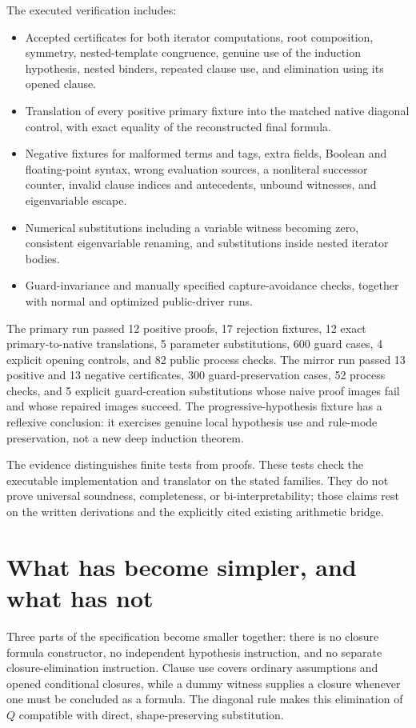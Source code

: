 \documentclass[11pt]{article}
\theoremstyle{definition}\newtheorem{definition}[theorem]{Definition}
\theoremstyle{remark}\newtheorem{remark}[theorem]{Remark}
\begin{document}
The executed verification includes:
\begin{itemize}
\item Accepted certificates for both iterator computations, root composition, symmetry, nested-template congruence, genuine use of the induction hypothesis, nested binders, repeated clause use, and elimination using its opened clause.
\item Translation of every positive primary fixture into the matched native diagonal control, with exact equality of the reconstructed final formula.
\item Negative fixtures for malformed terms and tags, extra fields, Boolean and floating-point syntax, wrong evaluation sources, a nonliteral successor counter, invalid clause indices and antecedents, unbound witnesses, and eigenvariable escape.
\item Numerical substitutions including a variable witness becoming zero, consistent eigenvariable renaming, and substitutions inside nested iterator bodies.
\item Guard-invariance and manually specified capture-avoidance checks, together with normal and optimized public-driver runs.
\end{itemize}
The primary run passed 12 positive proofs, 17 rejection fixtures, 12 exact primary-to-native translations, 5 parameter substitutions, 600 guard cases, 4 explicit opening controls, and 82 public process checks. The mirror run passed 13 positive and 13 negative certificates, 300 guard-preservation cases, 52 process checks, and 5 explicit guard-creation substitutions whose naive proof images fail and whose repaired images succeed. The progressive-hypothesis fixture has a reflexive conclusion: it exercises genuine local hypothesis use and rule-mode preservation, not a new deep induction theorem.

The evidence distinguishes finite tests from proofs. These tests check the executable implementation and translator on the stated families. They do not prove universal soundness, completeness, or bi-interpretability; those claims rest on the written derivations and the explicitly cited existing arithmetic bridge.

\section{What has become simpler, and what has not}

Three parts of the specification become smaller together: there is no closure formula constructor, no independent hypothesis instruction, and no separate closure-elimination instruction. Clause use covers ordinary assumptions and opened conditional closures, while a dummy witness supplies a closure whenever one must be concluded as a formula. The diagonal rule makes this elimination of $Q$ compatible with direct, shape-preserving substitution.
\end{document}
